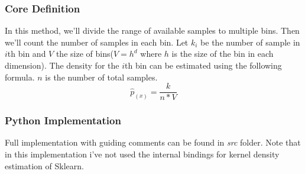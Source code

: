 \documentclass[12pt]{article}
\numberwithin{equation}{section}
\numberwithin{table}{section}
\numberwithin{figure}{section}
\begin{document}
\subsubsection*{Core Definition}
In this method, we'll divide the range of available samples to multiple bins. Then we'll count the number of samples in each bin. Let $k_i$ be the number of sample in $i$th bin and $V$ the size of bins($V = h^d$ where $h$ is the size of the bin in each dimension). The density for the $i$th bin can be estimated using the following formula. $n$ is the number of total samples.
\begin{equation}
	\hat{p}_{(x)} = \frac{k}{n * V}
\end{equation}
\subsubsection*{Python Implementation}
Full implementation with guiding comments can be found in \textit{src} folder. Note that in this implementation i've not used the internal bindings for kernel density estimation of Sklearn.
\end{document}
